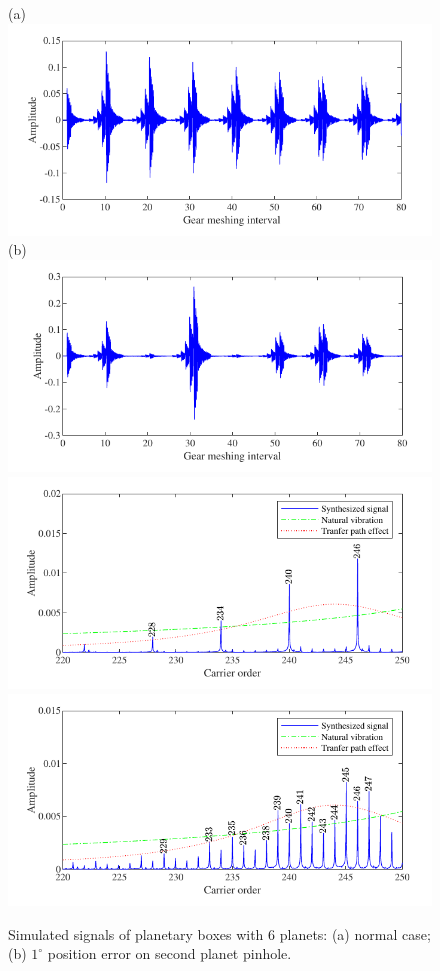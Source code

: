 \documentclass[a4paper,fleqn]{cas-sc}%
\begin{document}
\begin{figure}[pos=htbp]
    \centering
    (a) \includegraphics[scale=\myscale,valign=t]{Time_p6_normal.pdf}
    (b) \includegraphics[scale=\myscale,valign=t]{Time_p6_fault.pdf}\\
    \hspace*{1.5em}\includegraphics[scale=\myscale,valign=t]{Freq_p6_normal.pdf}
    \hspace*{1.5em}\includegraphics[scale=\myscale,valign=t]{Freq_p6_fault.pdf}
    \caption{Simulated signals of planetary boxes with 6 planets: (a) normal case; (b) $1^\circ$ position error on second planet pinhole.}
    \label{fig:simulated_p6}
\end{figure}
\end{document}
